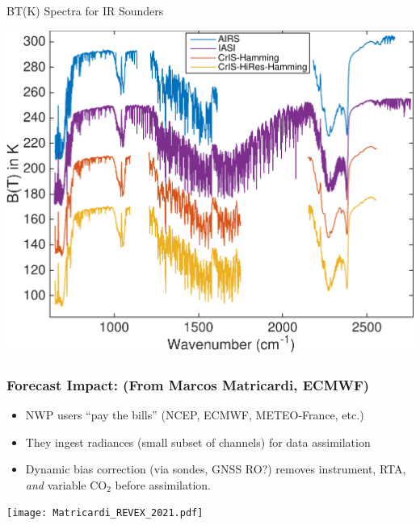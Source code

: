 \documentclass[10pt,t]{beamer}
\begin{document}
\begin{frame}{BT(K) Spectra for IR Sounders}
\begin{center}
\includegraphics[width=0.9\linewidth]{SunClimate2022/hyperall_hamming.pdf}
\end{center}
\end{frame}
\begin{frame}
  \frametitle{Forecast Impact: \small (From Marcos Matricardi, ECMWF)}
  \vspace{-0.1in}
  \begin{small}
  \begin{itemize}
  \item NWP users ``pay the bills'' (NCEP, ECMWF, METEO-France, etc.)
  \item They ingest radiances (small subset of channels) for data assimilation
  \item Dynamic bias correction (via sondes, GNSS RO?) removes instrument, RTA, \textit{and} variable CO$_2$ before assimilation.
\end{itemize}
  \end{small}
  \vspace{-0.45in}
  \texttt{[image: Matricardi\_REVEX\_2021.pdf]}
\end{frame}
\end{document}
